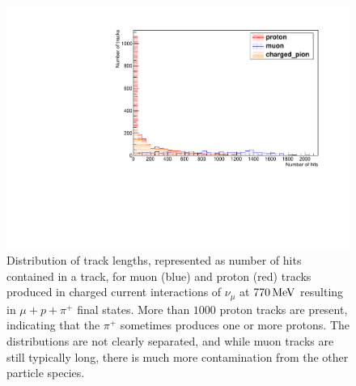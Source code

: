 \begin{figure}
\centering
\includegraphics[angle=-90,width=\textwidth]{chapters/particleid_images/ccpi-770-track-lengths}
\caption[Track length distribution for $\mu$ and $p$ from $770\MeV$ neutrinos(CCPi)]{\label{fig:ccpi-track-lengths-770MeV}Distribution of track lengths, represented as number of hits contained in a track, for muon (blue) and proton (red) tracks produced in charged current interactions of $\nu_\mu$ at $770\MeV$ resulting in $\mu + p + \pi^+$ final states. More than $1000$ proton tracks are present, indicating that the $\pi^+$ sometimes produces one or more protons. The distributions are not clearly separated, and while muon tracks are still typically long, there is much more contamination from the other particle species.}
\end{figure}

